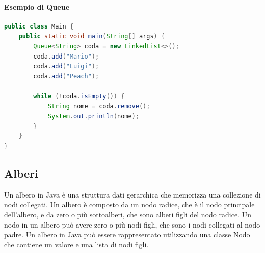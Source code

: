 \documentclass[11pt]{article}
\begin{document}
\paragraph{Esempio di Queue}
\begin{lstlisting}[language=Java]
public class Main {
    public static void main(String[] args) {
        Queue<String> coda = new LinkedList<>();
        coda.add("Mario");
        coda.add("Luigi");
        coda.add("Peach");

        while (!coda.isEmpty()) {
            String nome = coda.remove();
            System.out.println(nome);
        }
    }
}
\end{lstlisting}

\subsection{Alberi}
Un albero in Java è una struttura dati gerarchica che memorizza una collezione di nodi collegati.
Un albero è composto da un nodo radice, che è il nodo principale dell'albero, e da zero o più sottoalberi, che sono alberi figli del nodo radice.
Un nodo in un albero può avere zero o più nodi figli, che sono i nodi collegati al nodo padre.
Un albero in Java può essere rappresentato utilizzando una classe Nodo che contiene un valore e una lista di nodi figli.
\end{document}
